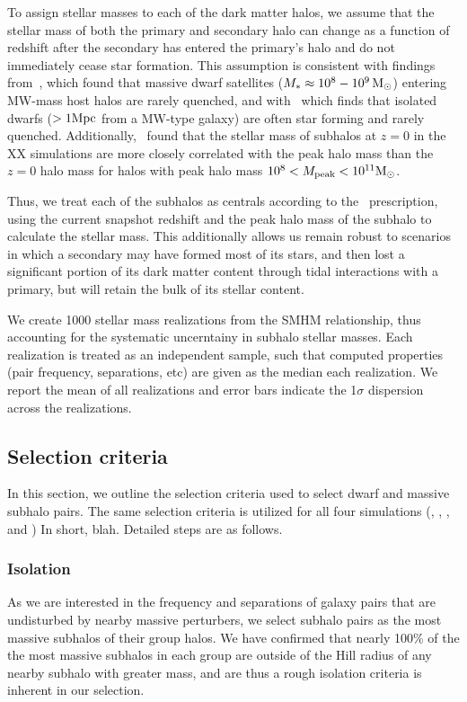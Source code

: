 \documentclass[twocolumn]{aastex631}
\begin{document}
To assign stellar masses to each of the dark matter halos, we assume that the stellar mass of both the primary and secondary halo can change as a function of redshift after the secondary has entered the primary's halo and do not immediately cease star formation.
This assumption is consistent with findings from~\cite{Akins2021}, which found that massive dwarf satellites ($M_*\approx 10^8-10^9\, \mathrm{M}_\odot$) entering MW-mass host halos are rarely quenched, and with~\cite{geha13} which finds that isolated dwarfs ($>1\mathrm{Mpc}$ from a MW-type galaxy) are often star forming and rarely quenched.
Additionally,~\citet{Munshi2021} found that the stellar mass of subhalos at $z=0$ in the XX simulations are more closely correlated with the peak halo mass than the $z=0$ halo mass for halos with peak halo mass $10^8<M_{\rm peak}<10^{11} \mathrm{M}_\odot$. 

Thus, we treat each of the subhalos as centrals according to the~\citet{Moster2013} prescription, using the current snapshot redshift and the peak halo mass of the subhalo to calculate the stellar mass. 
This additionally allows us remain robust to scenarios in which a secondary may have formed most of its stars, and then lost a significant portion of its dark matter content through tidal interactions with a primary, but will retain the bulk of its stellar content.

We create 1000 stellar mass realizations from the SMHM relationship, thus accounting for the systematic uncerntainy in subhalo stellar masses. Each realization is treated as an independent sample, such that computed properties (pair frequency, separations, etc) are given as the median each realization. We report the mean of all realizations and error bars indicate the 1$\sigma$ dispersion across the realizations.
\subsection{Selection criteria}\label{sec:methods-crit}
In this section, we outline the selection criteria used to select dwarf and massive subhalo pairs. 
The same selection criteria is utilized for all four simulations (\illd, \illh, \tngd, and \tngh)
In short, blah. 
Detailed steps are as follows. 

\subsubsection{Isolation}
As we are interested in the frequency and separations of galaxy pairs that are undisturbed by nearby massive perturbers, we select subhalo pairs as the most massive subhalos of their group halos. 
We have confirmed that nearly 100\% of the the most massive subhalos in each group are outside of the Hill radius of any nearby subhalo with greater mass, and are thus a rough isolation criteria is inherent in our selection.
\end{document}
